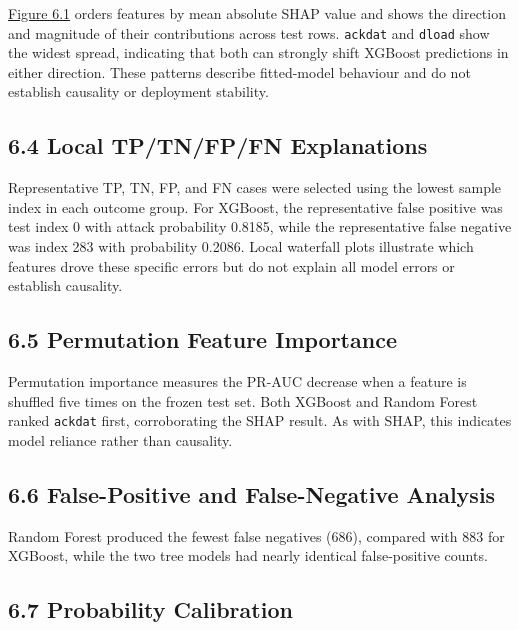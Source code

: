 \documentclass[
  canadian,
  12pt,
]{article}
\let\reportOrigSubsection\subsection
\renewcommand{\subsection}{\par\Needspace*{8\baselineskip}\reportOrigSubsection}%
\begin{document}
\hyperref[fig-6-1]{Figure 6.1} orders features by mean absolute SHAP
value and shows the direction and magnitude of their contributions
across test rows. \texttt{ackdat} and \texttt{dload} show the widest
spread, indicating that both can strongly shift XGBoost predictions in
either direction. These patterns describe fitted-model behaviour and do
not establish causality or deployment stability.

\subsection[\texorpdfstring{\numberline{6.4}Local TP/TN/FP/FN Explanations}{6.4 Local TP/TN/FP/FN Explanations}]{6.4 Local TP/TN/FP/FN Explanations}\label{sec-6-4}

Representative TP, TN, FP, and FN cases were selected using the lowest
sample index in each outcome group. For XGBoost, the representative
false positive was test index 0 with attack probability 0.8185, while
the representative false negative was index 283 with probability 0.2086.
Local waterfall plots illustrate which features drove these specific
errors but do not explain all model errors or establish causality.

\subsection[\texorpdfstring{\numberline{6.5}Permutation Feature Importance}{6.5 Permutation Feature Importance}]{6.5 Permutation Feature Importance}\label{sec-6-5}

Permutation importance measures the PR-AUC decrease when a feature is
shuffled five times on the frozen test set. Both XGBoost and Random
Forest ranked \texttt{ackdat} first, corroborating the SHAP result. As
with SHAP, this indicates model reliance rather than causality.

\subsection[\texorpdfstring{\numberline{6.6}False-Positive and False-Negative
Analysis}{6.6 False-Positive and False-Negative
Analysis}]{6.6 False-Positive and False-Negative
Analysis}\label{sec-6-6}

Random Forest produced the fewest false negatives (686), compared with
883 for XGBoost, while the two tree models had nearly identical
false-positive counts.

\subsection[\texorpdfstring{\numberline{6.7}Probability Calibration}{6.7 Probability Calibration}]{6.7 Probability Calibration}\label{sec-6-7}
\end{document}
